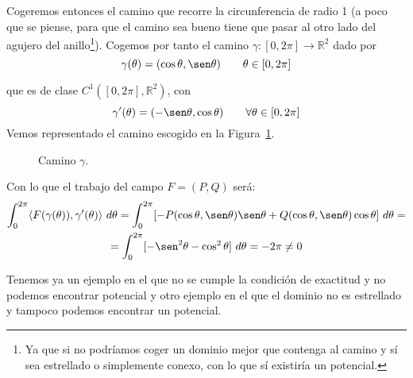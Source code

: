 \begin{ejemplo}
    Cogeremos entonces el camino que recorre la circunferencia de radio 1 (a poco que se piense, para que el camino sea bueno tiene que pasar al otro lado del agujero del anillo\footnote{Ya que si no podríamos coger un dominio mejor que contenga al camino y sí sea estrellado o simplemente conexo, con lo que sí existiría un potencial.}). Cogemos por tanto el camino $\gamma:[0,2\pi]\rightarrow\mathbb{R}^2$ dado por
    \begin{equation*}
        \gamma(\theta) = (\cos\theta, \sen\theta) \qquad \theta \in [0,2\pi]
    \end{equation*}

    que es de clase $C^1([0,2\pi], \mathbb{R}^2)$, con
    \begin{equation*}
        \gamma'(\theta) = (-\sen\theta,\cos\theta) \qquad \forall \theta \in [0,2\pi]
    \end{equation*}
    Vemos representado el camino escogido en la Figura~\ref{fig:camino_ejm}.

    \begin{figure}[H]
        \centering
        \caption{Camino $\gamma$.}
        \label{fig:camino_ejm}
    \end{figure}

    Con lo que el trabajo del campo $F=(P,Q)$ será:
    \begin{multline*}
        \int_{0}^{2\pi } \langle F(\gamma(\theta)),\gamma'(\theta) \rangle~d\theta = \int_{0}^{2\pi} [-P(\cos\theta,\sen\theta)\sen\theta + Q(\cos\theta,\sen\theta)\cos\theta]~d\theta  = \\
        = \int_{0}^{2\pi } [-\sen^2\theta-\cos^2\theta]~d\theta  = -2\pi \neq 0
    \end{multline*}
\end{ejemplo}
Tenemos ya un ejemplo en el que no se cumple la condición de exactitud y no podemos encontrar potencial y otro ejemplo en el que el dominio no es estrellado y tampoco podemos encontrar un potencial.

